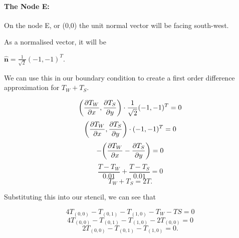 \documentclass[12pt,a4paper]{article}
\begin{document}
\paragraph*{The Node E:}
On the node E, or (0,0) the unit normal vector will be facing south-west.
\begin{center}
\end{center}
As a normalised vector, it will be 
\begin{center}
    $\hat{\textbf{n}} = \frac{1}{\sqrt{2}}(-1,-1)^T$.
\end{center}
We can use this in our boundary condition to create a first order difference approximation for $T_W + T_S$.
\begin{center}
  \[\bigg{(}\frac{\partial T_W}{\partial x},\frac{\partial T_S}{\partial y}\bigg{)}\cdot \frac{1}{\sqrt{2}}(-1,-1)^T = 0\]
  \[\bigg{(}\frac{\partial T_W}{\partial x},\frac{\partial T_S}{\partial y}\bigg{)}\cdot (-1,-1)^T = 0\]
  \[-\bigg{(}\frac{\partial T_W}{\partial x}-\frac{\partial T_S}{\partial y}\bigg{)} = 0\]
  \[\frac{T-T_W}{0.01}+\frac{T-T_S}{0.01} = 0\]
  \[T_W+T_S=2T.\]
\end{center}
Substituting this into our stencil, we can see that 
\begin{center}
\[4T_{(0,0)}-T_{(0,1)}-T_{(1,0)}-T_{W}-T{S}=0\]
\[4T_{(0,0)}-T_{(0,1)}-T_{(1,0)}-2T_{(0,0)}=0\]
\[2T_{(0,0)}-T_{(0,1)}-T_{(1,0)}=0.\]
\end{center}
\end{document}
